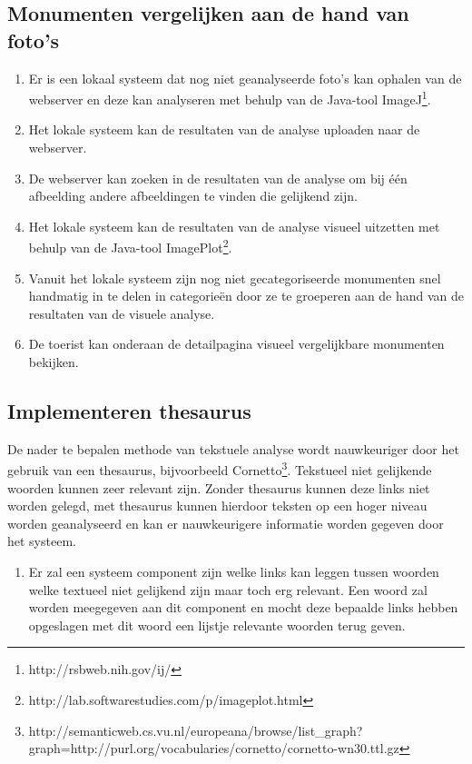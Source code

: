 \documentclass[a4paper,10pt]{article}
\begin{document}
            \subsection{Monumenten vergelijken aan de hand van foto's}
	  \begin{enumerate}
		\item Er is een lokaal systeem dat nog niet geanalyseerde foto's kan ophalen van de webserver en deze kan analyseren met behulp van de Java-tool ImageJ\footnote{http://rsbweb.nih.gov/ij/}.
		\item Het lokale systeem kan de resultaten van de analyse uploaden naar de webserver.
		\item De webserver kan zoeken in de resultaten van de analyse om bij \'e\'en afbeelding andere afbeeldingen te vinden die gelijkend zijn.
		\item Het lokale systeem kan de resultaten van de analyse visueel uitzetten met behulp van de Java-tool  ImagePlot\footnote{http://lab.softwarestudies.com/p/imageplot.html}.
		\item Vanuit het lokale systeem zijn nog niet gecategoriseerde monumenten snel handmatig in te delen in categorie\"en door ze te groeperen aan de hand van de resultaten van de visuele analyse.
		\item De toerist kan onderaan de detailpagina visueel vergelijkbare monumenten bekijken.
	  \end{enumerate}
	                
            \subsection{Implementeren thesaurus}
            De nader te bepalen methode van tekstuele analyse wordt nauwkeuriger door het gebruik van een thesaurus, bijvoorbeeld Cornetto\footnote{http://semanticweb.cs.vu.nl/europeana/browse/list\_graph?graph=http://purl.org/vocabularies/cornetto/cornetto-wn30.ttl.gz}. Tekstueel niet gelijkende woorden kunnen zeer relevant zijn. Zonder thesaurus kunnen deze links niet worden gelegd, met thesaurus kunnen hierdoor teksten op een hoger niveau worden geanalyseerd en kan er nauwkeurigere informatie worden gegeven door het systeem.
\begin{enumerate}
\item Er zal een systeem component zijn welke links kan leggen tussen woorden welke textueel niet gelijkend zijn maar toch erg relevant. Een woord zal worden meegegeven aan dit component en mocht deze bepaalde links hebben opgeslagen met dit woord een lijstje relevante woorden terug geven.
\end{enumerate}
        
\end{document}
